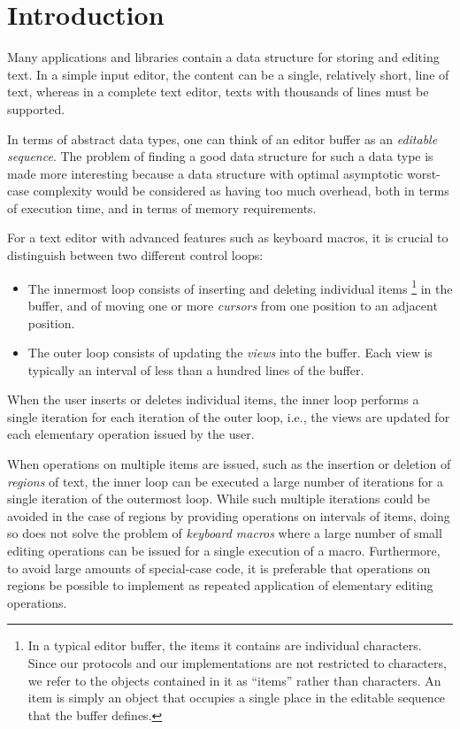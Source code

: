 \section{Introduction}
\label{sec-introduction}

Many applications and libraries contain a data structure for storing
and editing text.  In a simple input editor, the content can be a
single, relatively short, line of text, whereas in a complete text
editor, texts with thousands of lines must be supported.

In terms of abstract data types, one can think of an editor buffer as
an \emph{editable sequence}.  The problem of finding a good data
structure for such a data type is made more interesting because a data
structure with optimal asymptotic worst-case complexity would be
considered as having too much overhead, both in terms of execution
time, and in terms of memory requirements.

For a text editor with advanced features such as keyboard macros, it
is crucial to distinguish between two different control loops:

\begin{itemize}
\item The innermost loop consists of inserting and deleting individual
  items%
\footnote{In a typical editor buffer, the items it contains are
  individual characters.  Since our protocols and our implementations
  are not restricted to characters, we refer to the objects contained
  in it as ``items'' rather than characters.  An item is simply an
  object that occupies a single place in the editable sequence that
  the buffer defines.}
in the buffer, and of moving one or
  more \emph{cursors} from one position to an adjacent position.
\item The outer loop consists of updating the \emph{views} into the
  buffer.  Each view is typically an interval of less than a
  hundred lines of the buffer.
\end{itemize}

When the user inserts or deletes individual items, the inner loop
performs a single iteration for each iteration of the outer loop,
i.e., the views are updated for each elementary operation issued by
the user.

When operations on multiple items are issued, such as the insertion or
deletion of \emph{regions} of text, the inner loop can be executed a
large number of iterations for a single iteration of the outermost
loop.  While such multiple iterations could be avoided in the case of
regions by providing operations on intervals of items, doing so does
not solve the problem of \emph{keyboard macros} where a large number
of small editing operations can be issued for a single execution of a
macro.  Furthermore, to avoid large amounts of special-case code, it
is preferable that operations on regions be possible to implement as
repeated application of elementary editing operations.

